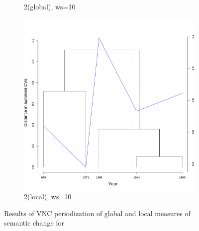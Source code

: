 \begin{figure}[H]
\begin{subfigure}{0.3\textwidth}
    \caption*{2\nds  (global), ws=10}
  \end{subfigure}
  \quad
  \begin{subfigure}{0.3\textwidth}
    \includegraphics[width=\linewidth]{figures_new/measures/VNC_measure_dist_w10_second_embed_local.pdf}
    \caption*{2\nds  (local), ws=10}
  \end{subfigure}
  
  \caption{Results of VNC periodization of global and local measures of semantic change for \jia}
\end{figure}

